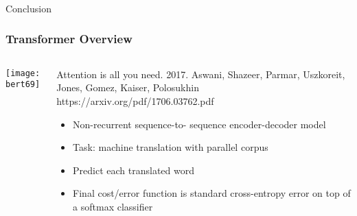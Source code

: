 \begin{frame}[fragile]\frametitle{}
\begin{center}
{\Large Conclusion}
\end{center}
\end{frame}

\begin{frame}[fragile]\frametitle{Transformer Overview}

\begin{columns}
    \begin{column}[T]{0.5\linewidth}
			\begin{center}
			\texttt{[image: bert69]}
			\end{center}		
		\end{column}
    \begin{column}[T]{0.5\linewidth}
		Attention is all you need. 2017.  Aswani, Shazeer, Parmar, Uszkoreit,  Jones, Gomez, Kaiser, Polosukhin  https://arxiv.org/pdf/1706.03762.pdf 

      \begin{itemize}
			\item Non-recurrent sequence-to-  sequence encoder-decoder model
			\item Task: machine translation  with parallel corpus
			\item Predict each translated word
			\item Final cost/error function is  standard cross-entropy error on top of a softmax classifier
			\end{itemize}
    \end{column}
  \end{columns}
			
\end{frame}

